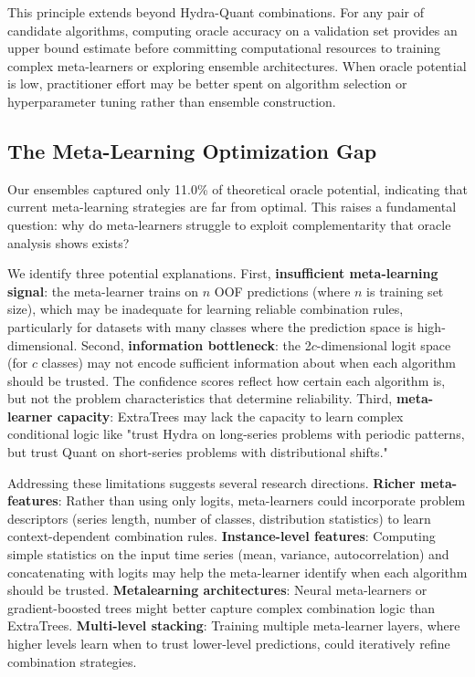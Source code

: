 \documentclass[pdflatex,sn-basic]{sn-jnl}           %
\theoremstyle{thmstyleone}%
\theoremstyle{thmstyletwo}%
\theoremstyle{thmstylethree}%
\begin{document}
This principle extends beyond Hydra-Quant combinations. For any pair of candidate algorithms, computing oracle accuracy on a validation set provides an upper bound estimate before committing computational resources to training complex meta-learners or exploring ensemble architectures. When oracle potential is low, practitioner effort may be better spent on algorithm selection or hyperparameter tuning rather than ensemble construction.

\subsection{The Meta-Learning Optimization Gap}

Our ensembles captured only 11.0\% of theoretical oracle potential, indicating that current meta-learning strategies are far from optimal. This raises a fundamental question: why do meta-learners struggle to exploit complementarity that oracle analysis shows exists?

We identify three potential explanations. First, \textbf{insufficient meta-learning signal}: the meta-learner trains on $n$ OOF predictions (where $n$ is training set size), which may be inadequate for learning reliable combination rules, particularly for datasets with many classes where the prediction space is high-dimensional. Second, \textbf{information bottleneck}: the 2$c$-dimensional logit space (for $c$ classes) may not encode sufficient information about when each algorithm should be trusted. The confidence scores reflect how certain each algorithm is, but not the problem characteristics that determine reliability. Third, \textbf{meta-learner capacity}: ExtraTrees may lack the capacity to learn complex conditional logic like "trust Hydra on long-series problems with periodic patterns, but trust Quant on short-series problems with distributional shifts."

Addressing these limitations suggests several research directions. \textbf{Richer meta-features}: Rather than using only logits, meta-learners could incorporate problem descriptors (series length, number of classes, distribution statistics) to learn context-dependent combination rules. \textbf{Instance-level features}: Computing simple statistics on the input time series (mean, variance, autocorrelation) and concatenating with logits may help the meta-learner identify when each algorithm should be trusted. \textbf{Metalearning architectures}: Neural meta-learners or gradient-boosted trees might better capture complex combination logic than ExtraTrees. \textbf{Multi-level stacking}: Training multiple meta-learner layers, where higher levels learn when to trust lower-level predictions, could iteratively refine combination strategies.
\end{document}
